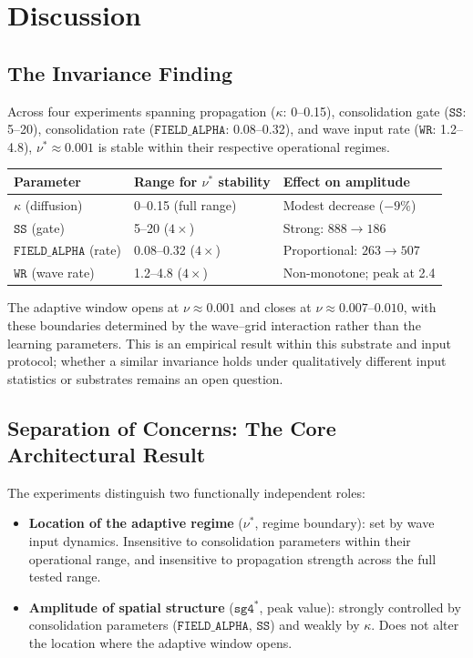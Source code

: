 \documentclass[11pt]{article}
\theoremstyle{remark}
\begin{document}
\section{Discussion}

\subsection{The Invariance Finding}

Across four experiments spanning propagation ($\kappa$: 0--0.15), consolidation
gate ($\mathtt{SS}$: 5--20), consolidation rate ($\mathtt{FIELD\_ALPHA}$: 0.08--0.32),
and wave input rate ($\mathtt{WR}$: 1.2--4.8), $\nu^* \approx 0.001$ is stable
within their respective operational regimes.

\begin{center}
\begin{tabular}{lll}
\toprule
Parameter & Range for $\nu^*$ stability & Effect on amplitude \\
\midrule
$\kappa$ (diffusion)             & 0--0.15 (full range)  & Modest decrease ($-9\%$) \\
$\mathtt{SS}$ (gate)             & 5--20 ($4\times$)     & Strong: $888 \to 186$ \\
$\mathtt{FIELD\_ALPHA}$ (rate)   & 0.08--0.32 ($4\times$) & Proportional: $263 \to 507$ \\
$\mathtt{WR}$ (wave rate)        & 1.2--4.8 ($4\times$)  & Non-monotone; peak at 2.4 \\
\bottomrule
\end{tabular}
\end{center}

The adaptive window opens at $\nu \approx 0.001$ and closes at $\nu \approx
0.007$--$0.010$, with these boundaries determined by the wave--grid interaction
rather than the learning parameters. This is an empirical result within this
substrate and input protocol; whether a similar invariance holds under qualitatively
different input statistics or substrates remains an open question.

\subsection{Separation of Concerns: The Core Architectural Result}

The experiments distinguish two functionally independent roles:

\begin{itemize}
  \item \textbf{Location of the adaptive regime} ($\nu^*$, regime boundary): set
    by wave input dynamics. Insensitive to consolidation parameters within their
    operational range, and insensitive to propagation strength across the full
    tested range.

  \item \textbf{Amplitude of spatial structure} ($\mathtt{sg4}^*$, peak value):
    strongly controlled by consolidation parameters ($\mathtt{FIELD\_ALPHA}$,
    $\mathtt{SS}$) and weakly by $\kappa$. Does not alter the location where
    the adaptive window opens.
\end{itemize}
\end{document}
